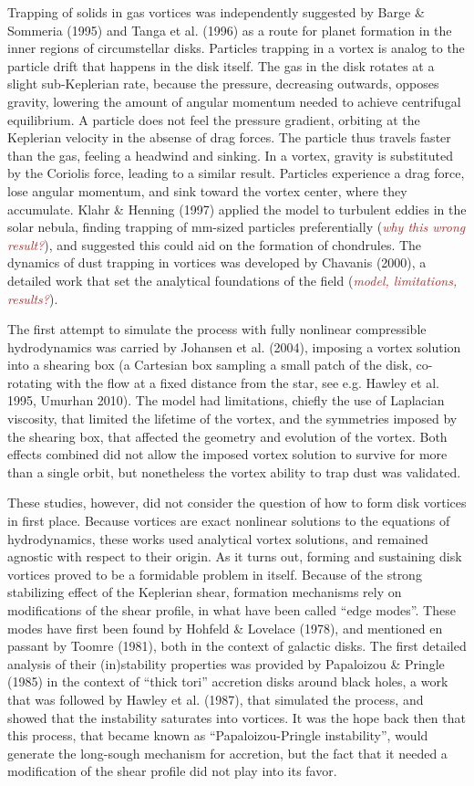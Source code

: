 \documentclass[apj]{emulateapj}
\def\brown#1{\textcolor{brown}{#1}}
\newcommand{\comm}[1]{({\it \brown{#1}})}
\begin{document}
Trapping of solids in gas vortices was independently suggested
by Barge \& Sommeria (1995) and Tanga et al. (1996) as a route for
planet formation in the inner regions of circumstellar
disks. Particles trapping in a vortex is analog to the particle drift
that happens in the disk
itself. The gas in the disk rotates at a slight sub-Keplerian rate,
because the pressure, decreasing outwards, opposes gravity,
lowering the amount of angular momentum needed to achieve centrifugal
equilibrium. A particle does not feel the pressure gradient, orbiting at
the Keplerian velocity in the absense of drag forces. The particle
thus travels faster than the gas, feeling a
headwind and sinking. In a vortex, gravity is substituted by the
Coriolis force, leading to a similar result. Particles experience a
drag force, lose angular momentum, and sink toward the vortex
center, where they accumulate. Klahr \& Henning (1997) applied the model 
to turbulent eddies in the solar nebula, finding trapping of mm-sized
particles preferentially \comm{why this wrong result?}, and suggested
this could aid on the formation of chondrules. The dynamics of dust
trapping in vortices was developed by Chavanis (2000), a detailed work 
that set the analytical foundations of the field \comm{model,
  limitations, results?}.  

The first attempt to simulate the process with
fully nonlinear compressible hydrodynamics was carried by Johansen et
al. (2004), imposing a vortex solution into a  shearing box (a Cartesian box sampling a small
patch of the disk, co-rotating with the flow at a fixed distance from
the star, see e.g. Hawley et al. 1995, Umurhan 2010). The model had limitations, chiefly the use of Laplacian
viscosity, that limited the lifetime of the vortex, and the symmetries
imposed by the shearing box, that affected the geometry and evolution
of the vortex.  Both effects combined did not allow the
imposed vortex solution to survive for more than a single orbit, but
nonetheless the vortex ability to trap dust was validated. 

These studies, however, did not consider the question of how to
form disk vortices in first place. Because vortices are exact nonlinear solutions to the equations of
hydrodynamics, these works used analytical vortex solutions, and remained
agnostic with respect to their origin. As it turns out, forming and
sustaining disk vortices proved to be a formidable problem in
itself. Because of the strong stabilizing effect of the Keplerian
shear, formation mechanisms rely on modifications of the shear
profile, in what have been called ``edge modes''. These modes have
first been found by Hohfeld \& Lovelace (1978), and mentioned en
passant by Toomre (1981), both in the context of galactic disks. The first detailed analysis of their
(in)stability properties was provided by Papaloizou \& Pringle (1985) in the
context of ``thick tori'' accretion disks around
black holes, a work that was followed by Hawley et al. (1987), that
simulated the process, and showed that the instability saturates into
vortices. It was the hope back then that this process, that became
known as ``Papaloizou-Pringle instability'', would generate the
long-sough mechanism for accretion, but the fact that it needed a
modification of the shear profile did not play into its favor. 
\end{document}
